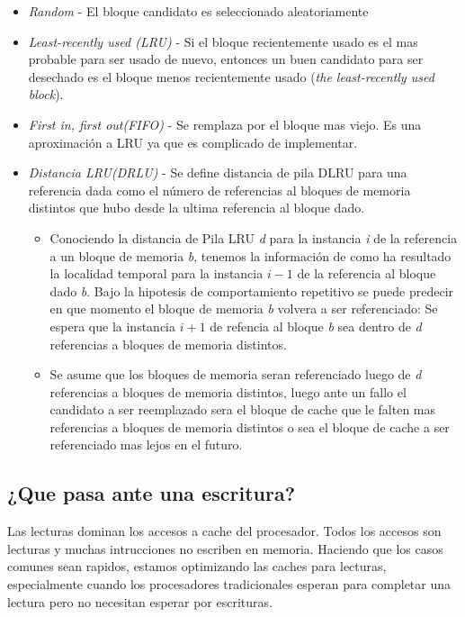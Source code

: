 \documentclass{article}
\begin{document}
\begin{itemize} 
    \item \textit{Random} - El bloque candidato es seleccionado aleatoriamente
    \item \textit{Least-recently used (LRU)} - Si el bloque recientemente usado es el mas probable para ser usado de nuevo, entonces un buen candidato para ser desechado es el bloque menos recientemente usado (\textit{the least-recently used block}).
    \item \textit{First in, first out(FIFO)} - Se remplaza por el bloque mas viejo. Es una aproximación a LRU ya que es complicado de implementar.
    \item \textit{Distancia LRU(DRLU)} - Se define distancia de pila DLRU para una referencia dada como el número de referencias al bloques de memoria distintos que hubo desde la ultima referencia al bloque dado.
    \begin{itemize}
        \item Conociendo la distancia de Pila LRU \textit{d} para la instancia \textit{i} de la referencia a un bloque de memoria \textit{b}, tenemos la información de como ha resultado la localidad temporal para la instancia \(i-1\) de la referencia al bloque dado \textit{b}. Bajo la hipotesis de comportamiento repetitivo se puede predecir en que momento el bloque de memoria \textit{b} volvera a ser referenciado: Se espera que la instancia \(i+1\) de refencia al bloque \textit{b} sea dentro de \textit{d} referencias a bloques de memoria distintos.
        \item Se asume que los bloques de memoria seran referenciado luego de \textit{d} referencias a bloques de memoria distintos, luego ante un fallo el candidato a ser reemplazado sera el bloque de cache que le falten mas referencias a bloques de memoria distintos o sea el bloque de cache a ser referenciado mas lejos en el futuro.
    \end{itemize} 
\end{itemize}

\subsection{¿Que pasa ante una escritura?}

Las lecturas dominan los accesos a cache del procesador. Todos los accesos son lecturas y muchas intrucciones no escriben en memoria. 
Haciendo que los casos comunes sean rapidos, estamos optimizando las caches para lecturas, especialmente cuando los procesadores
tradicionales esperan para completar una lectura pero no necesitan esperar por escrituras.
\end{document}
